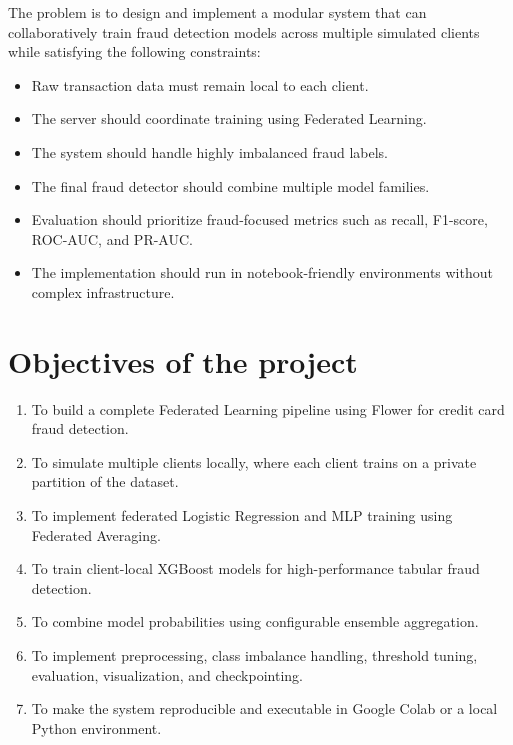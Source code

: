 The problem is to design and implement a modular system that can collaboratively train fraud detection models across multiple simulated clients while satisfying the following constraints:

\begin{itemize}
    \item Raw transaction data must remain local to each client.
    \item The server should coordinate training using Federated Learning.
    \item The system should handle highly imbalanced fraud labels.
    \item The final fraud detector should combine multiple model families.
    \item Evaluation should prioritize fraud-focused metrics such as recall, F1-score, ROC-AUC, and PR-AUC.
    \item The implementation should run in notebook-friendly environments without complex infrastructure.
\end{itemize}

\section{ Objectives of the project}
\begin{enumerate}
    \item To build a complete Federated Learning pipeline using Flower for credit card fraud detection.
    \item To simulate multiple clients locally, where each client trains on a private partition of the dataset.
    \item To implement federated Logistic Regression and MLP training using Federated Averaging.
    \item To train client-local XGBoost models for high-performance tabular fraud detection.
    \item To combine model probabilities using configurable ensemble aggregation.
    \item To implement preprocessing, class imbalance handling, threshold tuning, evaluation, visualization, and checkpointing.
    \item To make the system reproducible and executable in Google Colab or a local Python environment.
\end{enumerate}


